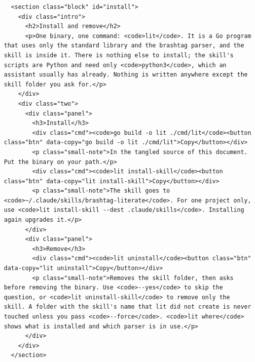 \documentclass[10pt,a4paper]{article}
\begin{document}
\begin{Verbatim}
  <section class="block" id="install">
    <div class="intro">
      <h2>Install and remove</h2>
      <p>One binary, one command: <code>lit</code>. It is a Go program that uses only the standard library and the brashtag parser, and the skill is inside it. There is nothing else to install; the skill's scripts are Python and need only <code>python3</code>, which an assistant usually has already. Nothing is written anywhere except the skill folder you ask for.</p>
    </div>
    <div class="two">
      <div class="panel">
        <h3>Install</h3>
        <div class="cmd"><code>go build -o lit ./cmd/lit</code><button class="btn" data-copy="go build -o lit ./cmd/lit">Copy</button></div>
        <p class="small-note">In the tangled source of this document. Put the binary on your path.</p>
        <div class="cmd"><code>lit install-skill</code><button class="btn" data-copy="lit install-skill">Copy</button></div>
        <p class="small-note">The skill goes to <code>~/.claude/skills/brashtag-literate</code>. For one project only, use <code>lit install-skill --dest .claude/skills</code>. Installing again upgrades it.</p>
      </div>
      <div class="panel">
        <h3>Remove</h3>
        <div class="cmd"><code>lit uninstall</code><button class="btn" data-copy="lit uninstall">Copy</button></div>
        <p class="small-note">Removes the skill folder, then asks before removing the binary. Use <code>--yes</code> to skip the question, or <code>lit uninstall-skill</code> to remove only the skill. A folder with the skill's name that lit did not create is never touched unless you pass <code>--force</code>. <code>lit where</code> shows what is installed and which parser is in use.</p>
      </div>
    </div>
  </section>


\end{Verbatim}
\end{document}
